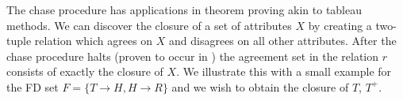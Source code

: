 {\renewcommand{\baselinestretch}{1}
\begin{figure}[ht]
\end{figure}
}

The chase procedure has applications in theorem proving akin to
tableau methods. We can discover the closure of a set of attributes
$X$ by creating a two-tuple relation which agrees on $X$ and disagrees
on all other attributes. After the chase procedure halts (proven to
occur in \cite{mms79}) the agreement set in the relation $r$ consists
of exactly the closure of $X$.  We illustrate this with a small
example for the FD set $F = \{ T \to H, H \to R \}$ and we wish to
obtain the closure of $T$, $T^+$.



